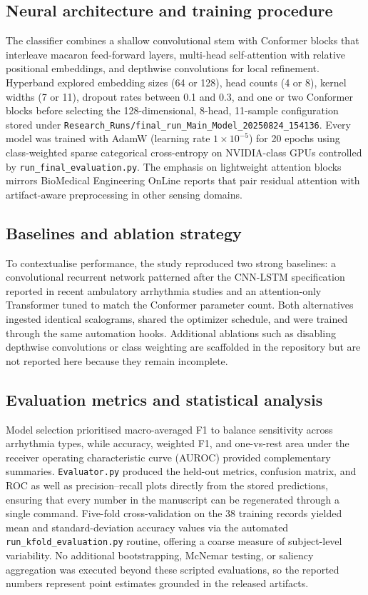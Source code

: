 \subsection{Neural architecture and training procedure}
The classifier combines a shallow convolutional stem with Conformer blocks that interleave macaron feed-forward layers, multi-head self-attention with relative positional embeddings, and depthwise convolutions for local refinement. Hyperband explored embedding sizes (64 or 128), head counts (4 or 8), kernel widths (7 or 11), dropout rates between 0.1 and 0.3, and one or two Conformer blocks before selecting the 128-dimensional, 8-head, 11-sample configuration stored under \texttt{Research\_Runs/final\_run\_Main\_Model\_20250824\_154136}. Every model was trained with AdamW (learning rate $1\times10^{-5}$) for 20 epochs using class-weighted sparse categorical cross-entropy on NVIDIA-class GPUs controlled by \texttt{run\_final\_evaluation.py}. The emphasis on lightweight attention blocks mirrors BioMedical Engineering OnLine reports that pair residual attention with artifact-aware preprocessing in other sensing domains.\cite{Chen2024SuperResolution,Qiu2025Attention,Sugiarto2025GroundReaction}

\subsection{Baselines and ablation strategy}
To contextualise performance, the study reproduced two strong baselines: a convolutional recurrent network patterned after the CNN-LSTM specification reported in recent ambulatory arrhythmia studies and an attention-only Transformer tuned to match the Conformer parameter count.\cite{Fira2025SingleChannel,Kirkbas2025CommonMatrix} Both alternatives ingested identical scalograms, shared the optimizer schedule, and were trained through the same automation hooks. Additional ablations such as disabling depthwise convolutions or class weighting are scaffolded in the repository but are not reported here because they remain incomplete.

\subsection{Evaluation metrics and statistical analysis}
Model selection prioritised macro-averaged F1 to balance sensitivity across arrhythmia types, while accuracy, weighted F1, and one-vs-rest area under the receiver operating characteristic curve (AUROC) provided complementary summaries. \texttt{Evaluator.py} produced the held-out metrics, confusion matrix, and ROC as well as precision--recall plots directly from the stored predictions, ensuring that every number in the manuscript can be regenerated through a single command. Five-fold cross-validation on the 38 training records yielded mean and standard-deviation accuracy values via the automated \texttt{run\_kfold\_evaluation.py} routine, offering a coarse measure of subject-level variability. No additional bootstrapping, McNemar testing, or saliency aggregation was executed beyond these scripted evaluations, so the reported numbers represent point estimates grounded in the released artifacts.
